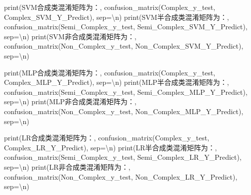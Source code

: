 \documentclass[
]{article}
\newenvironment{Shaded}{}{}
\newcommand{\BuiltInTok}[1]{#1}
\newcommand{\CharTok}[1]{\textcolor[rgb]{0.25,0.44,0.63}{#1}}
\newcommand{\NormalTok}[1]{#1}
\newcommand{\OperatorTok}[1]{\textcolor[rgb]{0.40,0.40,0.40}{#1}}
\newcommand{\StringTok}[1]{\textcolor[rgb]{0.25,0.44,0.63}{#1}}
\begin{document}
\begin{Shaded}
\begin{Highlighting}[]
\BuiltInTok{print}\NormalTok{(}\StringTok{\textquotesingle{}SVM合成类混淆矩阵为：\textquotesingle{}}\NormalTok{, confusion\_matrix(Complex\_y\_test, Complex\_SVM\_Y\_Predict), sep}\OperatorTok{=}\StringTok{\textquotesingle{}}\CharTok{\textbackslash{}n}\StringTok{\textquotesingle{}}\NormalTok{)}
\BuiltInTok{print}\NormalTok{(}\StringTok{\textquotesingle{}SVM半合成类混淆矩阵为：\textquotesingle{}}\NormalTok{, confusion\_matrix(Semi\_Complex\_y\_test, Semi\_Complex\_SVM\_Y\_Predict), sep}\OperatorTok{=}\StringTok{\textquotesingle{}}\CharTok{\textbackslash{}n}\StringTok{\textquotesingle{}}\NormalTok{)}
\BuiltInTok{print}\NormalTok{(}\StringTok{\textquotesingle{}SVM非合成类混淆矩阵为：\textquotesingle{}}\NormalTok{, confusion\_matrix(Non\_Complex\_y\_test, Non\_Complex\_SVM\_Y\_Predict), sep}\OperatorTok{=}\StringTok{\textquotesingle{}}\CharTok{\textbackslash{}n}\StringTok{\textquotesingle{}}\NormalTok{)}

\BuiltInTok{print}\NormalTok{(}\StringTok{\textquotesingle{}MLP合成类混淆矩阵为：\textquotesingle{}}\NormalTok{, confusion\_matrix(Complex\_y\_test, Complex\_MLP\_Y\_Predict), sep}\OperatorTok{=}\StringTok{\textquotesingle{}}\CharTok{\textbackslash{}n}\StringTok{\textquotesingle{}}\NormalTok{)}
\BuiltInTok{print}\NormalTok{(}\StringTok{\textquotesingle{}MLP半合成类混淆矩阵为：\textquotesingle{}}\NormalTok{, confusion\_matrix(Semi\_Complex\_y\_test, Semi\_Complex\_MLP\_Y\_Predict), sep}\OperatorTok{=}\StringTok{\textquotesingle{}}\CharTok{\textbackslash{}n}\StringTok{\textquotesingle{}}\NormalTok{)}
\BuiltInTok{print}\NormalTok{(}\StringTok{\textquotesingle{}MLP非合成类混淆矩阵为：\textquotesingle{}}\NormalTok{, confusion\_matrix(Non\_Complex\_y\_test, Non\_Complex\_MLP\_Y\_Predict), sep}\OperatorTok{=}\StringTok{\textquotesingle{}}\CharTok{\textbackslash{}n}\StringTok{\textquotesingle{}}\NormalTok{)}

\BuiltInTok{print}\NormalTok{(}\StringTok{\textquotesingle{}LR合成类混淆矩阵为：\textquotesingle{}}\NormalTok{, confusion\_matrix(Complex\_y\_test, Complex\_LR\_Y\_Predict), sep}\OperatorTok{=}\StringTok{\textquotesingle{}}\CharTok{\textbackslash{}n}\StringTok{\textquotesingle{}}\NormalTok{)}
\BuiltInTok{print}\NormalTok{(}\StringTok{\textquotesingle{}LR半合成类混淆矩阵为：\textquotesingle{}}\NormalTok{, confusion\_matrix(Semi\_Complex\_y\_test, Semi\_Complex\_LR\_Y\_Predict), sep}\OperatorTok{=}\StringTok{\textquotesingle{}}\CharTok{\textbackslash{}n}\StringTok{\textquotesingle{}}\NormalTok{)}
\BuiltInTok{print}\NormalTok{(}\StringTok{\textquotesingle{}LR非合成类混淆矩阵为：\textquotesingle{}}\NormalTok{, confusion\_matrix(Non\_Complex\_y\_test, Non\_Complex\_LR\_Y\_Predict), sep}\OperatorTok{=}\StringTok{\textquotesingle{}}\CharTok{\textbackslash{}n}\StringTok{\textquotesingle{}}\NormalTok{)}
\end{Highlighting}
\end{Shaded}
\end{document}
